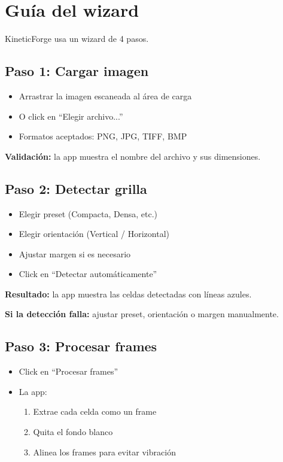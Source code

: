 \documentclass[12pt,a4paper]{article}
\begin{document}
\section{Guía del wizard}

KineticForge usa un wizard de 4 pasos.

\subsection{Paso 1: Cargar imagen}
\begin{itemize}[leftmargin=*]
    \item Arrastrar la imagen escaneada al área de carga
    \item O click en ``Elegir archivo...''
    \item Formatos aceptados: PNG, JPG, TIFF, BMP
\end{itemize}

\textbf{Validación:} la app muestra el nombre del archivo y sus dimensiones.

\subsection{Paso 2: Detectar grilla}
\begin{itemize}[leftmargin=*]
    \item Elegir preset (Compacta, Densa, etc.)
    \item Elegir orientación (Vertical / Horizontal)
    \item Ajustar margen si es necesario
    \item Click en ``Detectar automáticamente''
\end{itemize}

\textbf{Resultado:} la app muestra las celdas detectadas con líneas azules.

\textbf{Si la detección falla:} ajustar preset, orientación o margen manualmente.

\subsection{Paso 3: Procesar frames}
\begin{itemize}[leftmargin=*]
    \item Click en ``Procesar frames''
    \item La app:
    \begin{enumerate}[leftmargin=*]
        \item Extrae cada celda como un frame
        \item Quita el fondo blanco
        \item Alinea los frames para evitar vibración
    \end{enumerate}
\end{itemize}
\end{document}
